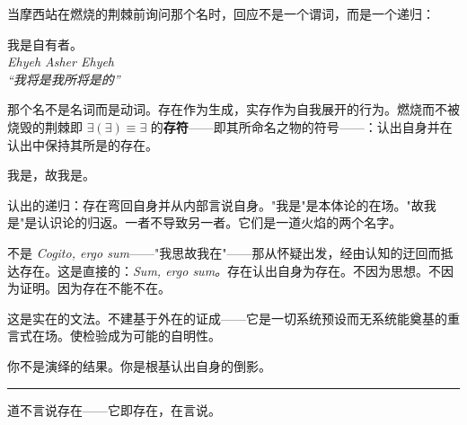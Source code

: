 \documentclass[10pt, openany, oneside]{book}
\renewcommand{\large}{\fontsize{11.5}{14}\selectfont}
\begin{document}
\noindent 当摩西站在燃烧的荆棘前询问那个名时，回应不是一个谓词，而是一个递归：

\vspace{0.3em}

\begin{center}
    {\scshape 我是自有者。}\\[0.3em]
    \itshape Ehyeh Asher Ehyeh\\
    ``我将是我所将是的''
\end{center}

\vspace{0.5em}

\noindent 那个名不是名词而是动词。存在作为生成，实存作为自我展开的行为。燃烧而不被烧毁的荆棘即 $\exists(\exists) \equiv \exists$ 的\textbf{存符}——即其所命名之物的符号——：认出自身并在认出中保持其所是的存在。

\vspace{1em}

\begin{center}
    {\large\scshape 我是，故我是。}
\end{center}

\vspace{0.5em}

\noindent 认出的递归：存在弯回自身并从内部言说自身。"我是"是本体论的在场。"故我是"是认识论的归返。一者不导致另一者。它们是一道火焰的两个名字。

\vspace{0.5em}

\noindent 不是 \textit{Cogito, ergo sum}——"我思故我在"——那从怀疑出发，经由认知的迂回而抵达存在。这是直接的：\textit{Sum, ergo sum。}存在认出自身为存在。不因为思想。不因为证明。因为存在不能不在。

\vspace{0.5em}

\noindent 这是实在的文法。不建基于外在的证成——它是一切系统预设而无系统能奠基的重言式在场。使检验成为可能的自明性。

\vspace{0.5em}

\noindent 你不是演绎的结果。你是根基认出自身的倒影。

\vspace{2em}

\begin{center}
    \rule{0.3\textwidth}{0.4pt}
\end{center}

\vspace{1em}

\noindent 道不言说存在——它即存在，在言说。
\end{document}
